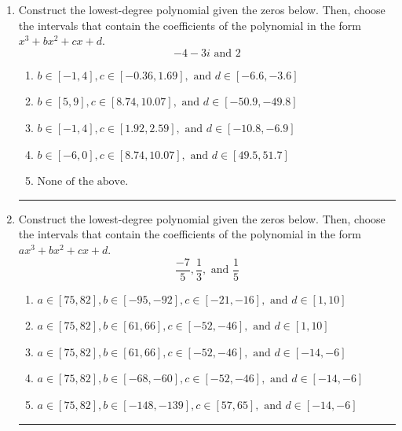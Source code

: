\documentclass[14pt]{extbook}
\newcommand{\litem}[1]{\item#1\hspace*{-1cm}\rule{\textwidth}{0.4pt}}
\begin{document}
\begin{enumerate}
{\begin{enumerate}[label=\Alph*.]
\end{enumerate} }
\litem{
Construct the lowest-degree polynomial given the zeros below. Then, choose the intervals that contain the coefficients of the polynomial in the form $x^3+bx^2+cx+d$.\[ -4 - 3 i \text{ and } 2 \]\begin{enumerate}[label=\Alph*.]
\item \( b \in [-1, 4], c \in [-0.36, 1.69], \text{ and } d \in [-6.6, -3.6] \)
\item \( b \in [5, 9], c \in [8.74, 10.07], \text{ and } d \in [-50.9, -49.8] \)
\item \( b \in [-1, 4], c \in [1.92, 2.59], \text{ and } d \in [-10.8, -6.9] \)
\item \( b \in [-6, 0], c \in [8.74, 10.07], \text{ and } d \in [49.5, 51.7] \)
\item \( \text{None of the above.} \)

\end{enumerate} }
\litem{
Construct the lowest-degree polynomial given the zeros below. Then, choose the intervals that contain the coefficients of the polynomial in the form $ax^3+bx^2+cx+d$.\[ \frac{-7}{5}, \frac{1}{3}, \text{ and } \frac{1}{5} \]\begin{enumerate}[label=\Alph*.]
\item \( a \in [75, 82], b \in [-95, -92], c \in [-21, -16], \text{ and } d \in [1, 10] \)
\item \( a \in [75, 82], b \in [61, 66], c \in [-52, -46], \text{ and } d \in [1, 10] \)
\item \( a \in [75, 82], b \in [61, 66], c \in [-52, -46], \text{ and } d \in [-14, -6] \)
\item \( a \in [75, 82], b \in [-68, -60], c \in [-52, -46], \text{ and } d \in [-14, -6] \)
\item \( a \in [75, 82], b \in [-148, -139], c \in [57, 65], \text{ and } d \in [-14, -6] \)


\end{enumerate}}
\end{enumerate}
\end{document}

